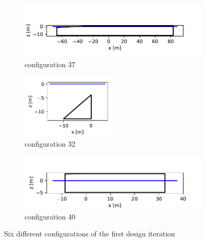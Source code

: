 \begin{figure}[h]
    \begin{subfigure}[b]{0.49\textwidth}   
        \centering 
        \includegraphics[width=\textwidth]{figures/ComFLOW/Breakwater Geometries/Design Iteration 1 captive/general/breakwater_geometry37.pdf}
        \caption[]%
        {{\small}configuration 37}    
        \label{fig: It1 Configuration 37}
    \end{subfigure}
    \hfill
    \begin{subfigure}[b]{0.49\textwidth}   
        \centering 
        \includegraphics[width=0.5\textwidth]{figures/ComFLOW/Breakwater Geometries/Design Iteration 1 captive/general/breakwater_geometry32.pdf}
        \caption[]%
        {{\small}configuration 32}    
        \label{fig: It1 Configuration 40}
    \end{subfigure}
        \hfill
    \begin{subfigure}[b]{0.49\textwidth}   
        \centering 
        \includegraphics[width=\textwidth]{figures/ComFLOW/Breakwater Geometries/Design Iteration 1 captive/general/breakwater_geometry40.pdf}
        \caption[]%
        {{\small}configuration 40}    
        \label{fig: It1 Configuration 45}
    \end{subfigure}
    
    \caption{Six different configurations of the first design iteration}
    \label{fig:Configurations 1to6 DI1 captive}
\end{figure}


